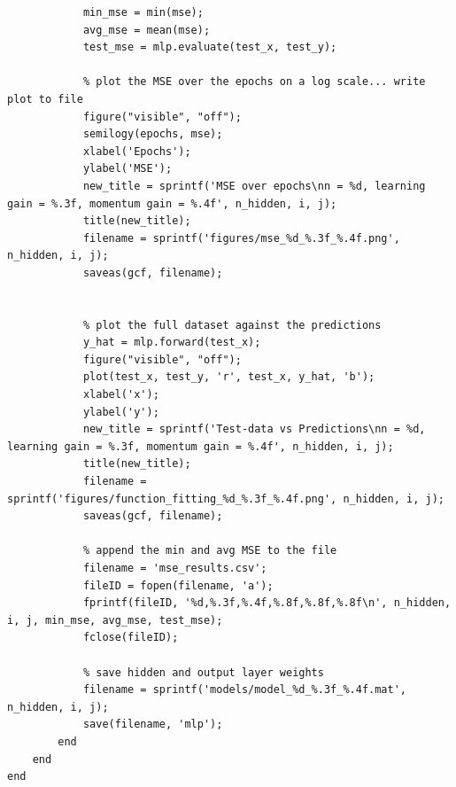 \documentclass[11pt,pdftex,portrait,letterpaper]{article}
\begin{document}
\begin{lstlisting}
            min_mse = min(mse);
            avg_mse = mean(mse);
            test_mse = mlp.evaluate(test_x, test_y);

            % plot the MSE over the epochs on a log scale... write plot to file
            figure("visible", "off");
            semilogy(epochs, mse);
            xlabel('Epochs');
            ylabel('MSE');
            new_title = sprintf('MSE over epochs\nn = %d, learning gain = %.3f, momentum gain = %.4f', n_hidden, i, j);
            title(new_title);
            filename = sprintf('figures/mse_%d_%.3f_%.4f.png', n_hidden, i, j);
            saveas(gcf, filename);


            % plot the full dataset against the predictions
            y_hat = mlp.forward(test_x);
            figure("visible", "off");
            plot(test_x, test_y, 'r', test_x, y_hat, 'b');
            xlabel('x');
            ylabel('y');
            new_title = sprintf('Test-data vs Predictions\nn = %d, learning gain = %.3f, momentum gain = %.4f', n_hidden, i, j);
            title(new_title);
            filename = sprintf('figures/function_fitting_%d_%.3f_%.4f.png', n_hidden, i, j);
            saveas(gcf, filename);

            % append the min and avg MSE to the file
            filename = 'mse_results.csv';
            fileID = fopen(filename, 'a');
            fprintf(fileID, '%d,%.3f,%.4f,%.8f,%.8f,%.8f\n', n_hidden, i, j, min_mse, avg_mse, test_mse);
            fclose(fileID);

            % save hidden and output layer weights
            filename = sprintf('models/model_%d_%.3f_%.4f.mat', n_hidden, i, j);
            save(filename, 'mlp');
        end
    end
end
\end{lstlisting}

\newpage
\end{document}
